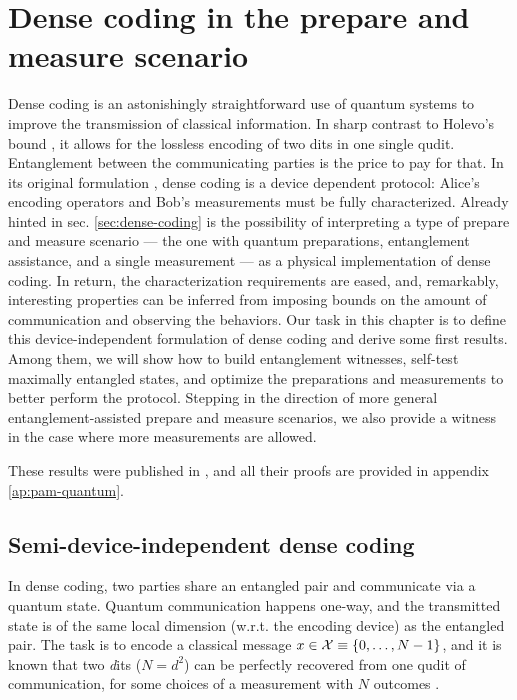 \chapter{Dense coding in the prepare and measure scenario}
\label{chap:pam-quantum}

    Dense coding is an astonishingly straightforward use of quantum systems to improve the transmission of classical information. In sharp contrast to Holevo's bound \cite{holevo-bound-1973}, it allows for the lossless encoding of two dits in one single qudit. Entanglement between the communicating parties is the price to pay for that. In its original formulation \cite{bennett_1992_superdense}, dense coding is a device dependent protocol: Alice's encoding operators and Bob's measurements must be fully characterized. Already hinted in sec. \ref{sec:dense-coding} is the possibility of interpreting a type of prepare and measure scenario --- the one with quantum preparations, entanglement assistance, and a single measurement --- as a physical implementation of dense coding. In return, the characterization requirements are eased, and, remarkably, interesting properties can be inferred from imposing bounds on the amount of communication and observing the behaviors. Our task in this chapter is to define this device-independent formulation of dense coding and derive some first results. Among them, we will show how to build entanglement witnesses, self-test maximally entangled states, and optimize the preparations and measurements to better perform the protocol. Stepping in the direction of more general entanglement-assisted prepare and measure scenarios, we also provide a witness in the case where more measurements are allowed.

    These results were published in \cite{moreno_pamdense_2021}, and all their proofs are provided in appendix \ref{ap:pam-quantum}.


    \section{Semi-device-independent dense coding}
    \label{sec:sdi-dense-coding}
        In dense coding, two parties share an entangled pair and communicate via a quantum state. Quantum communication happens one-way, and the transmitted state is of the same local dimension (w.r.t. the encoding device) as the entangled pair. The task is to encode a classical message $x \in \mathcal{X} \equiv \{ 0, \ldots, N-1 \}$, and it is known that two \emph{d}its ($N = d^2$) can be perfectly recovered from one qudit of communication, for some choices of a measurement with $N$ outcomes \cite{barenco_dense_1995}.
    
